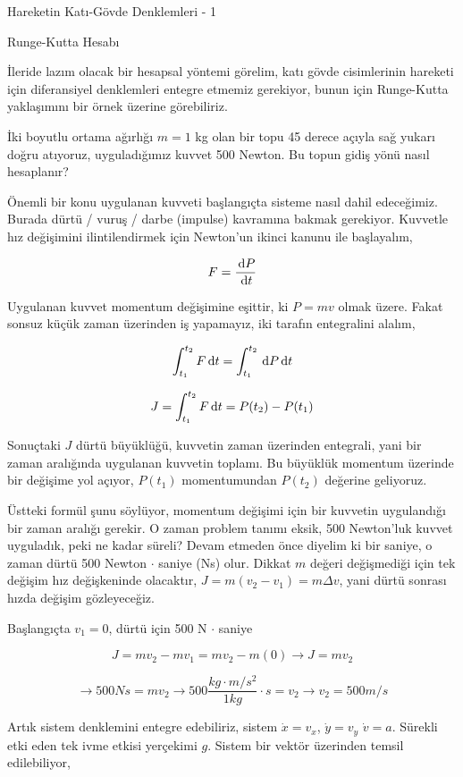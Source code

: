 \documentclass[12pt,fleqn]{article}\usepackage{../../common}
\begin{document}
Hareketin Katı-Gövde Denklemleri - 1

Runge-Kutta Hesabı

İleride lazım olacak bir hesapsal yöntemi görelim, katı gövde cisimlerinin
hareketi için diferansiyel denklemleri entegre etmemiz gerekiyor, bunun
için Runge-Kutta yaklaşımını bir örnek üzerine görebiliriz.

İki boyutlu ortama ağırlığı $m=1$ kg olan bir topu 45 derece açıyla sağ yukarı
doğru atıyoruz, uyguladığımız kuvvet 500 Newton. Bu topun gidiş yönü nasıl
hesaplanır?

Önemli bir konu uygulanan kuvveti başlangıçta sisteme nasıl dahil edeceğimiz.
Burada dürtü / vuruş / darbe (impulse) kavramına bakmak gerekiyor. Kuvvetle hız
değişimini ilintilendirmek için Newton'un ikinci kanunu ile başlayalım,

$$
F = \frac{\,\mathrm{d} P}{\,\mathrm{d} t} 
$$

Uygulanan kuvvet momentum değişimine eşittir, ki $P = mv$ olmak üzere. Fakat
sonsuz küçük zaman üzerinden iş yapamayız, iki tarafın entegralini alalım,

$$
\int_{t_1}^{t_2} F \,\mathrm{d} t = \int_{t_1}^{t_2} \,\mathrm{d} P \,\mathrm{d} t
$$

$$
J = \int_{t_1}^{t_2} F \,\mathrm{d} t = P(t_2) - P(t_1)
$$

Sonuçtaki $J$ dürtü büyüklüğü, kuvvetin zaman üzerinden entegrali, yani
bir zaman aralığında uygulanan kuvvetin toplamı. Bu büyüklük momentum
üzerinde bir değişime yol açıyor, $P(t_1)$ momentumundan $P(t_2)$
değerine geliyoruz.

Üstteki formül şunu söylüyor, momentum değişimi için bir kuvvetin uygulandığı
bir zaman aralığı gerekir. O zaman problem tanımı eksik, 500 Newton'luk kuvvet
uyguladık, peki ne kadar süreli? Devam etmeden önce diyelim ki bir saniye, o
zaman dürtü 500 Newton $\cdot$ saniye (Ns) olur. Dikkat $m$ değeri değişmediği
için tek değişim hız değişkeninde olacaktır, $J = m(v_2 - v_1) = m \Delta v$,
yani dürtü sonrası hızda değişim gözleyeceğiz.

Başlangıçta $v_1=0$, dürtü için 500 N $\cdot$ saniye

$$
J = m v_2 - m v_1 = m v_2 - m(0) \to J = m v_2
$$

$$
\to 500 Ns = m v_2
\to 500 \frac{kg \cdot m/s^2}{1 kg } \cdot s = v_2
\to v_2 = 500 m/s
$$

Artık sistem denklemini entegre edebiliriz, sistem $\dot{x} = v_x$,
$\dot{y} = v_y$ $\dot{v} = a$. Sürekli etki eden tek ivme etkisi yerçekimi
$g$. Sistem bir vektör üzerinden temsil edilebiliyor,
\end{document}
